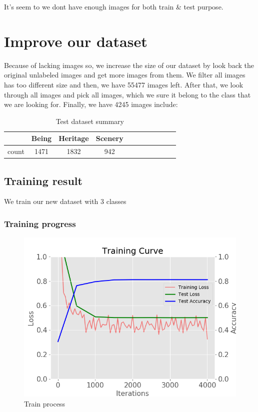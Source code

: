 \documentclass[11pt]{article}
\begin{document}
It's seem to we dont have enough images for both train \& test purpose. 

\section{Improve our dataset}

Because of lacking images so, we increase the size of our dataset by look back the original unlabeled images and get more images from them. We filter all images has too different size and then, we have 55477 images left. After that, we  look through all images and pick all images, which we sure it belong to the class that we are looking for. Finally, we have 4245 images include:
 
\begin{table}[H]
\begin{center}
\begin{tabular}{| c | c | c | c | c | c | c | c | c | c | c |}
\hline
 & Being & Heritage & Scenery\\
\hline
count & 1471 & 1832 & 942 \\
\hline
\end{tabular}
\caption {Test dataset summary}
\end{center}
\end{table}

\subsection{Training result}

We train our new dataset with 3 classes

\subsubsection{Training progress}

\begin{figure}[H]
\centering
\includegraphics[width=1\textwidth]{images/70_10_20_train_large_dataset}
\caption{Train process}
\end{figure}
\end{document}
